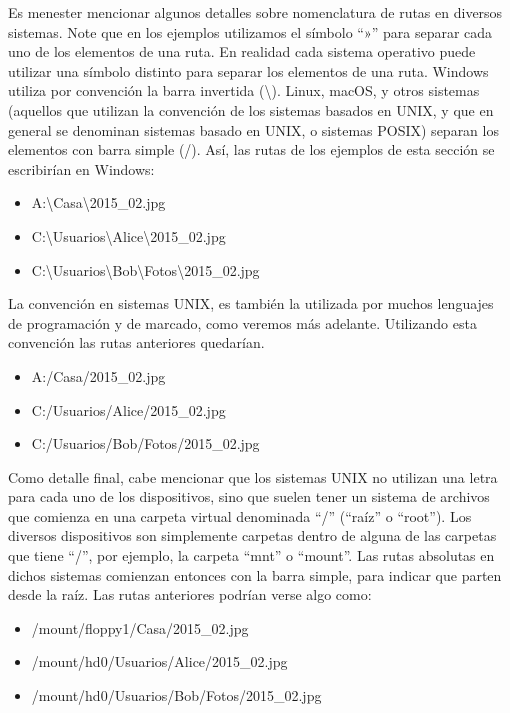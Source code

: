 Es menester mencionar algunos detalles sobre nomenclatura de rutas
en diversos sistemas. Note que en los ejemplos utilizamos el símbolo ``»'' para
separar cada uno de los elementos de una ruta. En realidad cada sistema operativo
puede utilizar una símbolo distinto para separar los elementos de una ruta.
Windows utiliza por convención la barra invertida (\textbackslash). Linux,
macOS, y otros sistemas (aquellos que utilizan la convención de los sistemas
basados en UNIX, y que en general se denominan sistemas basado en UNIX, o sistemas
POSIX) separan los elementos con barra simple (/). Así, las rutas de los ejemplos
de esta sección se escribirían en Windows:
\begin{itemize}
    \item A:\textbackslash Casa\textbackslash 2015\_02.jpg
    \item C:\textbackslash Usuarios\textbackslash Alice\textbackslash 2015\_02.jpg
    \item C:\textbackslash Usuarios\textbackslash Bob\textbackslash Fotos\textbackslash 2015\_02.jpg
\end{itemize}

La convención en sistemas UNIX, es también la utilizada por muchos lenguajes de
programación y de marcado, como veremos más adelante. Utilizando esta convención
las rutas anteriores quedarían.
\begin{itemize}
    \item A:/Casa/2015\_02.jpg
    \item C:/Usuarios/Alice/2015\_02.jpg
    \item C:/Usuarios/Bob/Fotos/2015\_02.jpg
\end{itemize}

Como detalle final, cabe mencionar que los sistemas UNIX no utilizan una letra
para cada uno de los dispositivos, sino que suelen tener un sistema de archivos
que comienza en una carpeta virtual denominada ``/'' (``raíz'' o ``root'').
Los diversos dispositivos son simplemente carpetas dentro de alguna de las
carpetas que tiene ``/'', por ejemplo, la carpeta ``mnt'' o ``mount''. Las rutas
absolutas en dichos sistemas comienzan entonces con la barra simple, para indicar
que parten desde la raíz. Las rutas anteriores podrían verse algo como:
\begin{itemize}
    \item /mount/floppy1/Casa/2015\_02.jpg
    \item /mount/hd0/Usuarios/Alice/2015\_02.jpg
    \item /mount/hd0/Usuarios/Bob/Fotos/2015\_02.jpg
\end{itemize}

